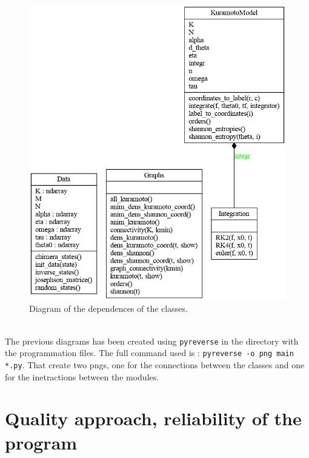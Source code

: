 \documentclass[1pt, a4paper]{article}
\begin{document}
\begin{figure}[htbp]
    \centering
    \includegraphics[scale=0.4]{figures/classes_kuramotoModel.png}
    \caption{Diagram of the dependences of the classes.}
    \label{fig:diagram_classes}
\end{figure}\\
The previous diagrams has been created using \texttt{pyreverse} in the directory with the programmation files. The full command used is : \texttt{pyreverse -o png main *.py}. That create two pngs, one for the connections between the classes and one for the inetractions between the modules.
\newpage
\noindent
\section{Quality approach, reliability of the program}

\newpage


\end{document}
